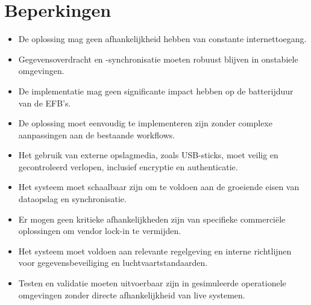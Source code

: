 \documentclass{hogent-article}
\begin{document}
    \section{Beperkingen}
    \begin{itemize}
    \item De oplossing mag geen afhankelijkheid hebben van constante internettoegang.
    \item Gegevensoverdracht en -synchronisatie moeten robuust blijven in onstabiele omgevingen.
    \item De implementatie mag geen significante impact hebben op de batterijduur van de EFB's.
    \item De oplossing moet eenvoudig te implementeren zijn zonder complexe aanpassingen aan de bestaande workflows.
    \item Het gebruik van externe opslagmedia, zoals USB-sticks, moet veilig en gecontroleerd verlopen, inclusief encryptie en authenticatie.
    \item Het systeem moet schaalbaar zijn om te voldoen aan de groeiende eisen van dataopslag en synchronisatie.
    \item Er mogen geen kritieke afhankelijkheden zijn van specifieke commerciële oplossingen om vendor lock-in te vermijden.
    \item Het systeem moet voldoen aan relevante regelgeving en interne richtlijnen voor gegevensbeveiliging en luchtvaartstandaarden.
    \item Testen en validatie moeten uitvoerbaar zijn in gesimuleerde operationele omgevingen zonder directe afhankelijkheid van live systemen.
    \end{itemize}

    
\end{document}
